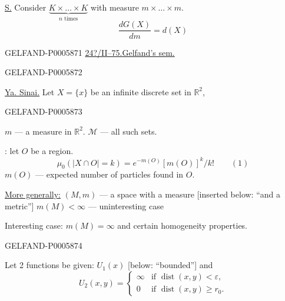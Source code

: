 \underline{S.} Consider
\(\displaystyle\underbrace{K\times\ldots\times K}_{n\text{ times}}\)
with measure \(m\times\ldots\times m\).
\[
\frac{dG(X)}{dm}=d(X)
\]
\par\noindent\hfill
\makebox[.72\linewidth]{\leaders\hbox{\kern.55em\rule{.23em}{.4pt}\kern.55em}\hfill}
\hfill\mbox{}\par


\begin{GelfandAdjacentEvidence}{GELFAND-P000587}{1}
\underline{24?/II--75.}\qquad \underline{Gelfand's sem.}
\end{GelfandAdjacentEvidence}
\begin{GelfandAdjacentEvidence}{GELFAND-P000587}{2}


\underline{Ya. Sinai.} Let \(X=\{x\}\) be an infinite discrete set in \(\mathbb R^2\),
\end{GelfandAdjacentEvidence}
\begin{GelfandAdjacentEvidence}{GELFAND-P000587}{3}

\(m\) — a measure in \(\mathbb R^2\).
\(\mathcal M\) — all such sets.

: let \(O\) be a region.
\[
\mu_0(\lvert X\cap O\rvert=k)=e^{-m(O)}[m(O)]^k/k!\qquad (1)
\]
\(m(O)\) — expected number of particles found in \(O\).

\underline{More generally:} \((M,m)\) — a space with a measure [inserted below: “and a metric”]
\(m(M)<\infty\) — uninteresting case

Interesting case: \(m(M)=\infty\) and certain homogeneity properties.
\end{GelfandAdjacentEvidence}
\begin{GelfandAdjacentEvidence}{GELFAND-P000587}{4}


Let 2 functions be given: \(U_1(x)\) [below: “bounded”] and
\[
U_2(x,y)=
\begin{cases}
\infty & \text{if }\operatorname{dist}(x,y)<\varepsilon,\\
0 & \text{if }\operatorname{dist}(x,y)\ge r_0.
\end{cases}
\]
\end{GelfandAdjacentEvidence}

